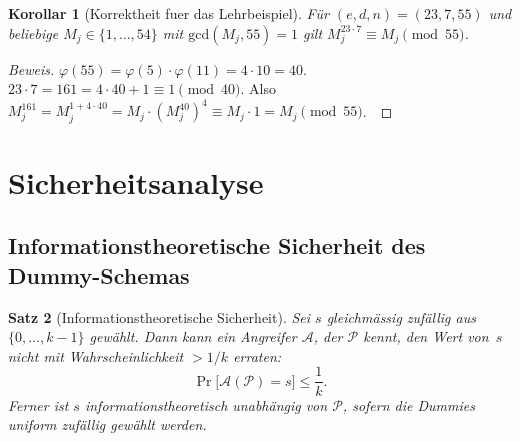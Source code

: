 ﻿\documentclass[12pt, a4paper]{article}
\theoremstyle{plain}
\newtheorem{theorem}{Satz}[section]
\newtheorem{corollary}[theorem]{Korollar}
\theoremstyle{definition}
\theoremstyle{remark}
\newenvironment{myproof}[1][Beweis]{%
  \begin{proof}[#1]
}{%
  \end{proof}
}
\newcommand{\Adv}{\mathcal{A}}
\newcommand{\GCD}{\mathrm{gcd}}
\begin{document}
\begin{corollary}[Korrektheit fuer das Lehrbeispiel]\label{cor:korrektheit_bsp}
  F\"ur $(e,d,n) = (23, 7, 55)$ und beliebige $M_j \in \{1,\ldots,54\}$
  mit $\GCD(M_j, 55) = 1$ gilt $M_j^{23 \cdot 7} \equiv M_j \pmod{55}$.
\end{corollary}

\begin{myproof}
  $\varphi(55) = \varphi(5)\cdot\varphi(11) = 4\cdot10 = 40$.
  $23\cdot7 = 161 = 4\cdot40+1 \equiv 1\pmod{40}$.
  Also $M_j^{161} = M_j^{1+4\cdot40} = M_j\cdot(M_j^{40})^4
  \equiv M_j \cdot 1 = M_j \pmod{55}$.~
\end{myproof}

\section{Sicherheitsanalyse}
\label{sec:sicherheit}

\subsection{Informationstheoretische Sicherheit des Dummy-Schemas}

\begin{theorem}[Informationstheoretische Sicherheit]\label{thm:info_sicher}
  Sei $s$ gleichm\"assig zuf\"allig aus $\{0,\ldots,k-1\}$ gew\"ahlt.
  Dann kann ein Angreifer $\Adv$, der $\mathcal{P}$ kennt, den Wert von~$s$
  nicht mit Wahrscheinlichkeit $> 1/k$ erraten:
  \[
    \Pr\bigl[\Adv(\mathcal{P}) = s\bigr] \leq \frac{1}{k}.
  \]
  Ferner ist $s$ informationstheoretisch unabh\"angig von $\mathcal{P}$,
  sofern die Dummies uniform zuf\"allig gew\"ahlt werden.
\end{theorem}
\end{document}
